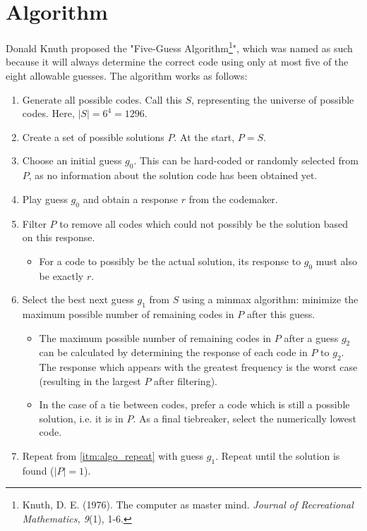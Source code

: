 \documentclass{article}
\begin{document}
\section{Algorithm}
\label{sec:algorithm}
Donald Knuth proposed the "Five-Guess Algorithm\footnote{Knuth, D. E. (1976). The computer as master mind. \textit{Journal of Recreational Mathematics, 9}(1), 1-6.}", which was named as such because it will always determine the correct code using only at most five of the eight allowable guesses. The algorithm works as follows:
\begin{enumerate}[label=\textbf{S.\arabic*}]
	\item Generate all possible codes. Call this $S$, representing the universe of possible codes. Here, $|S| = 6^4 = 1296$.
	\item Create a set of possible solutions $P$. At the start, $P=S$.
	\item Choose an initial guess $g_0$. This can be hard-coded or randomly selected from $P$, as no information about the solution code has been obtained yet.
	\item \label{itm:algo_repeat} Play guess $g_0$ and obtain a response $r$ from the codemaker.
	\item \label{itm:algo_filter} Filter $P$ to remove all codes which could not possibly be the solution based on this response.
		\begin{itemize}
		\item For a code to possibly be the actual solution, its response to $g_0$ must also be exactly $r$.
		\end{itemize}
	\item Select the best next guess $g_1$ from $S$ using a minmax algorithm: minimize the maximum possible number of remaining codes in $P$ after this guess.
		\begin{itemize}
		\item The maximum possible number of remaining codes in $P$ after a guess $g_2$ can be calculated by determining the response of each code in $P$ to $g_2$. The response which appears with the greatest frequency is the worst case (resulting in the largest $P$ after filtering).
		\item In the case of a tie between codes, prefer a code which is still a possible solution, i.e. it is in $P$. As a final tiebreaker, select the numerically lowest code.
		\end{itemize}
	\item Repeat from \autoref{itm:algo_repeat} with guess $g_1$. Repeat until the solution is found ($|P|=1$).
\end{enumerate}
\end{document}
